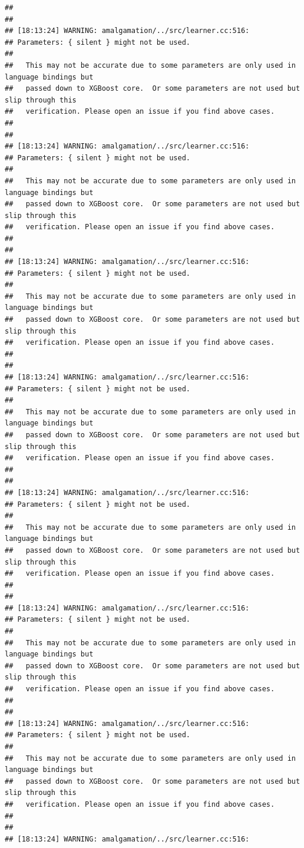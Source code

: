 \documentclass[AMS,STIX2COL]{WileyNJD-v2}\usepackage[]{graphicx}\usepackage[]{color}
\makeatletter
\newenvironment{kframe}{%
 \def\at@end@of@kframe{}%
 \ifinner\ifhmode%
  \def\at@end@of@kframe{\end{minipage}}%
  \begin{minipage}{\columnwidth}%
 \fi\fi%
 \def\FrameCommand##1{\hskip\@totalleftmargin \hskip-\fboxsep
 \colorbox{shadecolor}{##1}\hskip-\fboxsep
     \hskip-\linewidth \hskip-\@totalleftmargin \hskip\columnwidth}%
 \MakeFramed {\advance\hsize-\width
   \@totalleftmargin\z@ \linewidth\hsize
   \@setminipage}}%
 {\par\unskip\endMakeFramed%
 \at@end@of@kframe}
\newenvironment{knitrout}{}{} %
\makeatother
\begin{document}
\begin{knitrout}
\begin{kframe}
\begin{verbatim}
## 
## 
## [18:13:24] WARNING: amalgamation/../src/learner.cc:516: 
## Parameters: { silent } might not be used.
## 
##   This may not be accurate due to some parameters are only used in language bindings but
##   passed down to XGBoost core.  Or some parameters are not used but slip through this
##   verification. Please open an issue if you find above cases.
## 
## 
## [18:13:24] WARNING: amalgamation/../src/learner.cc:516: 
## Parameters: { silent } might not be used.
## 
##   This may not be accurate due to some parameters are only used in language bindings but
##   passed down to XGBoost core.  Or some parameters are not used but slip through this
##   verification. Please open an issue if you find above cases.
## 
## 
## [18:13:24] WARNING: amalgamation/../src/learner.cc:516: 
## Parameters: { silent } might not be used.
## 
##   This may not be accurate due to some parameters are only used in language bindings but
##   passed down to XGBoost core.  Or some parameters are not used but slip through this
##   verification. Please open an issue if you find above cases.
## 
## 
## [18:13:24] WARNING: amalgamation/../src/learner.cc:516: 
## Parameters: { silent } might not be used.
## 
##   This may not be accurate due to some parameters are only used in language bindings but
##   passed down to XGBoost core.  Or some parameters are not used but slip through this
##   verification. Please open an issue if you find above cases.
## 
## 
## [18:13:24] WARNING: amalgamation/../src/learner.cc:516: 
## Parameters: { silent } might not be used.
## 
##   This may not be accurate due to some parameters are only used in language bindings but
##   passed down to XGBoost core.  Or some parameters are not used but slip through this
##   verification. Please open an issue if you find above cases.
## 
## 
## [18:13:24] WARNING: amalgamation/../src/learner.cc:516: 
## Parameters: { silent } might not be used.
## 
##   This may not be accurate due to some parameters are only used in language bindings but
##   passed down to XGBoost core.  Or some parameters are not used but slip through this
##   verification. Please open an issue if you find above cases.
## 
## 
## [18:13:24] WARNING: amalgamation/../src/learner.cc:516: 
## Parameters: { silent } might not be used.
## 
##   This may not be accurate due to some parameters are only used in language bindings but
##   passed down to XGBoost core.  Or some parameters are not used but slip through this
##   verification. Please open an issue if you find above cases.
## 
## 
## [18:13:24] WARNING: amalgamation/../src/learner.cc:516: 

\end{verbatim}
\end{kframe}
\end{knitrout}
\end{document}
